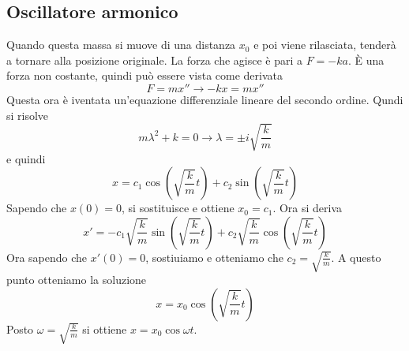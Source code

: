 \subsection{Oscillatore armonico}
\begin{center}
\end{center}
Quando questa massa si muove di una distanza $x_0$ e poi viene rilasciata, tenderà a tornare alla
posizione originale. La forza che agisce è pari a $F=-ka$. È una forza non costante, quindi
può essere vista come derivata
\begin{equation*}
  F = m x'' \rightarrow -kx = mx''
\end{equation*}
Questa ora è iventata un'equazione differenziale lineare del secondo ordine. Qundi si risolve
\begin{equation*}
  m\lambda^2+k=0 \rightarrow \lambda=\pm i \sqrt{\frac{k}{m}}
\end{equation*}
e quindi
\begin{equation*}
  x=c_1\cos\left(\sqrt{\frac{k}{m}}t\right)+c_2\sin\left(\sqrt{\frac{k}{m}}t\right)
\end{equation*}
Sapendo che $x(0)=0$, si sostituisce e ottiene $x_0=c_1$. Ora si deriva
\begin{equation*}
  x'=-c_1\sqrt{\frac{k}{m}}\sin\left(\sqrt{\frac{k}{m}}t\right)+
  c_2\sqrt{\frac{k}{m}}\cos\left(\sqrt{\frac{k}{m}}t\right)
\end{equation*}
Ora sapendo che $x'(0)=0$, sostiuiamo e otteniamo che $c_2=\sqrt{\frac{k}{m}}$. A questo punto
otteniamo la soluzione
\begin{equation*}
  x=x_0\cos\left(\sqrt{\frac{k}{m}}t\right)
\end{equation*}
Posto $\omega=\sqrt{\frac{k}{m}}$ si ottiene $x=x_0\cos\omega t$.

